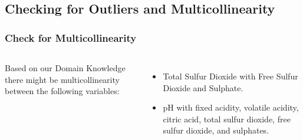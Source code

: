 \documentclass{beamer}
\begin{document}
	\subsection{Checking for Outliers and Multicollinearity}
	\begin{frame}
		\frametitle{Check for Multicollinearity}
			\begin{footnotesize}
			\begin{columns}
				\hspace{5pt}
			Based on our Domain Knowledge there might be multicollinearity between the following variables:  \par
			\begin{itemize}
			\item Total Sulfur Dioxide with Free Sulfur Dioxide and Sulphate.  

			\item pH with fixed acidity, volatile acidity, citric acid, total sulfur dioxide, free sulfur dioxide, and sulphates.  


\end{itemize}
\end{columns}
\end{footnotesize}
\end{frame}
\end{document}
